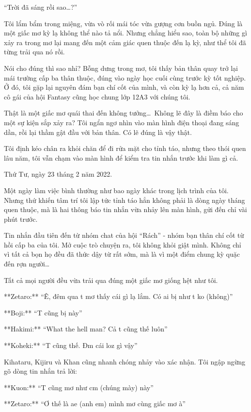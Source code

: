 \documentclass[../main.tex]{subfiles}
\begin{document}
``Trời đã sáng rồi sao\dots?''

Tôi lẩm bẩm trong miệng, vừa vò rối mái tóc vừa gượng cơn buồn ngủ. Đúng là một giấc mơ kỳ lạ không thể nào tả nổi. Nhưng chẳng hiểu sao, toàn bộ những gì xảy ra trong mơ lại mang đến một cảm giác quen thuộc đến lạ kỳ, như thể tôi đã từng trải qua nó rồi.

Nói cho đúng thì sao nhỉ? Bỗng dưng trong mơ, tôi thấy bản thân quay trở lại mái trường cấp ba thân thuộc, đúng vào ngày học cuối cùng trước kỳ tốt nghiệp. Ở đó, tôi gặp lại nguyên đám bạn chí cốt của mình, và còn kỳ lạ hơn cả, cả năm cô gái của hội Fantasy cũng học chung lớp 12A3 với chúng tôi.

Thật là một giấc mơ quái thai đến không tưởng\dots\ Không lẽ đây là điềm báo cho một sự kiện sắp xảy ra? Tôi ngẩn ngơ nhìn vào màn hình điện thoại đang sáng dần, rồi lại thầm gật đầu với bản thân. Có lẽ đúng là vậy thật.

Tôi định kéo chân ra khỏi chăn để đi rửa mặt cho tỉnh táo, nhưng theo thói quen lâu năm, tôi vẫn chạm vào màn hình để kiểm tra tin nhắn trước khi làm gì cả.

Thứ Tư, ngày 23 tháng 2 năm 2022.

Một ngày làm việc bình thường như bao ngày khác trong lịch trình của tôi. Nhưng thứ khiến tâm trí tôi lập tức tỉnh táo hẳn không phải là dòng ngày tháng quen thuộc, mà là hai thông báo tin nhắn vừa nhảy lên màn hình, gửi đến chỉ vài phút trước.

Tin nhắn đầu tiên đến từ nhóm chat của hội ``Rách'' - nhóm bạn thân chí cốt từ hồi cấp ba của tôi. Mở cuộc trò chuyện ra, tôi không khỏi giật mình. Không chỉ vì tất cả bọn họ đều đã thức dậy từ rất sớm, mà là vì một điểm chung kỳ quặc đến rợn người\dots

Tất cả mọi người đều vừa trải qua đúng một giấc mơ giống hệt như tôi.

**Zetaro:** ``Ê, đêm qua t mơ thấy cái gì lạ lắm. Có ai bị như t ko (không)''

**Boji:** ``T cũng bị này''

**Hakimi:** ``What the hell man? Cả t cũng thế luôn''

**Koheki:** ``T cũng thế. Đm cái loz gì vậy''

Kihataru, Kijiru và Khan cũng nhanh chóng nhảy vào xác nhận. Tôi ngập ngừng gõ dòng tin nhắn trả lời:

**Kuon:** ``T cũng mơ như cm (chúng mày) này''

**Zetaro:** ``Ơ thế là ae (anh em) mình mơ cùng giấc mơ à''
\end{document}
